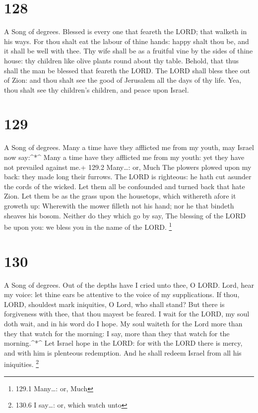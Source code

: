 \hypertarget{section-128}{%
\section{128}\label{section-128}}

A Song of degrees.  Blessed is every one that feareth the
LORD; that walketh in his ways.  For thou shalt eat the
labour of thine hands: happy shalt thou be, and it shall be well with
thee.  Thy wife shall be as a fruitful vine by the sides of
thine house: thy children like olive plants round about thy table.
 Behold, that thus shall the man be blessed that feareth the
LORD.  The LORD shall bless thee out of Zion: and thou shalt
see the good of Jerusalem all the days of thy life.  Yea,
thou shalt see thy children's children, and peace upon Israel.

\hypertarget{section-129}{%
\section{129}\label{section-129}}

A Song of degrees.  Many a time have they afflicted me from
my youth, may Israel now say:\^{}*\^{}  Many a time have
they afflicted me from my youth: yet they have not prevailed against
me.+ 129.2 Many\ldots: or, Much  The plowers plowed upon my
back: they made long their furrows.  The LORD is righteous:
he hath cut asunder the cords of the wicked.  Let them all
be confounded and turned back that hate Zion.  Let them be
as the grass upon the housetops, which withereth afore it groweth up:
 Wherewith the mower filleth not his hand; nor he that
bindeth sheaves his bosom.  Neither do they which go by say,
The blessing of the LORD be upon you: we bless you in the name of the
LORD. \footnote{129.1 Many\ldots: or, Much}

\hypertarget{section-130}{%
\section{130}\label{section-130}}

A Song of degrees.  Out of the depths have I cried unto
thee, O LORD.  Lord, hear my voice: let thine ears be
attentive to the voice of my supplications.  If thou, LORD,
shouldest mark iniquities, O Lord, who shall stand?  But
there is forgiveness with thee, that thou mayest be feared. 
I wait for the LORD, my soul doth wait, and in his word do I hope.
 My soul waiteth for the Lord more than they that watch for
the morning: I say, more than they that watch for the morning.\^{}*\^{}
 Let Israel hope in the LORD: for with the LORD there is
mercy, and with him is plenteous redemption.  And he shall
redeem Israel from all his iniquities. \footnote{130.6 I say\ldots: or,
  which watch unto}


